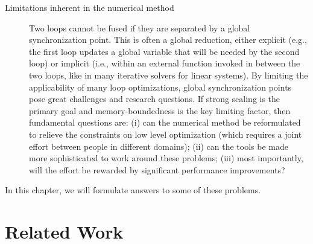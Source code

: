\begin{description}
\item[Limitations inherent in the numerical method] Two loops cannot be fused if they are separated by a global synchronization point. This is often a global reduction, either explicit (e.g., the first loop updates a global variable that will be needed by the second loop) or implicit (i.e., within an external function invoked in between the two loops, like in many iterative solvers for linear systems). By limiting the applicability of many loop optimizations, global synchronization points pose great challenges and research questions. If strong scaling is the primary goal and memory-boundedness is the key limiting factor, then fundamental questions are: (i) can the numerical method be reformulated to relieve the constraints on low level optimization (which requires a joint effort between people in different domains); (ii) can the tools be made more sophisticated to work around these problems; (iii) most importantly, will the effort be rewarded by significant performance improvements?
\end{description}

In this chapter, we will formulate answers to some of these problems.



%
%
%
%
%
%
%
%

\section{Related Work}
\label{sec:tiling:relatedwork}

